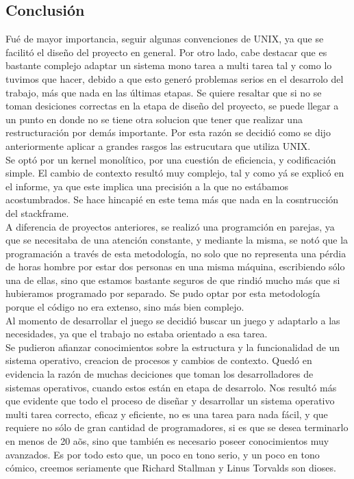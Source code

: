 \documentclass[10pt,a4paper]{article}
\begin{document}
\subsection{Conclusi\'on}
Fu\'e de mayor importancia, seguir algunas convenciones de UNIX, ya que se facilit\'o el dise\~no del proyecto en general. Por otro lado, cabe destacar que es bastante complejo adaptar un sistema mono tarea a multi tarea tal y como lo tuvimos que hacer, debido a que esto gener\'o problemas serios en el desarrolo del trabajo, m\'as que nada en las \'ultimas etapas. Se quiere resaltar que si no se toman desiciones correctas en la etapa de dise\~no del proyecto, se puede llegar a un punto en donde no se tiene otra solucion que tener que realizar una restructuraci\'on por dem\'as importante. Por esta raz\'on se decidi\'o como se dijo anteriormente aplicar a grandes rasgos las estrucutara que utiliza UNIX.\\
Se opt\'o por un kernel monol\'itico, por una cuesti\'on de eficiencia, y codificaci\'on simple. El cambio de contexto result\'o muy complejo,  tal y como y\'a se explic\'o en el informe, ya que este implica una precisi\'on a la que no est\'abamos acostumbrados. Se hace hincapi\'e en este tema m\'as que nada en la cosntrucci\'on del stackframe.\\
A diferencia de proyectos anteriores, se realiz\'o una programci\' on en parejas, ya que se necesitaba de una atenci\'on constante, y mediante la misma, se not\'o que la programaci\'on a trav\'es de esta metodolog\'ia, no solo que no representa una p\'erdia de horas hombre por estar dos personas en una misma m\'aquina, escribiendo s\'olo una de ellas, sino que estamos bastante seguros de que rindi\'o mucho m\'as que si hubieramos programado por separado. Se pudo optar por esta metodolog\'ia porque el c\'odigo no era extenso, sino m\'as bien complejo.\\
Al momento de desarrollar el juego se decidi\'o buscar un juego y adaptarlo a las necesidades, ya que el trabajo no estaba orientado a esa tarea.\\
Se pudieron afianzar conocimientos sobre la estructura y la funcionalidad de un sistema operativo, creacion de procesos y cambios de contexto. Qued\'o en evidencia la raz\'on de muchas deciciones que toman los desarrolladores de sistemas operativos, cuando estos est\'an en etapa de desarrolo. Nos result\'o m\'as que evidente que todo el proceso de dise\~nar y desarrollar un sistema operativo multi tarea correcto, eficaz y eficiente, no es una tarea para nada f\'acil, y que requiere no s\'olo de gran cantidad de programadores, si es que se desea terminarlo en menos de 20 a\~os, sino que tambi\'en es necesario poseer conocimientos muy avanzados. Es por todo esto que, un poco en tono serio, y un poco en tono c\'omico, creemos seriamente que Richard Stallman y Linus Torvalds son dioses.\\ 
\end{document}
